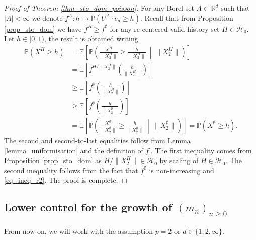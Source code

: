 \documentclass[a4paper, 11pt]{article}
\theoremstyle{plain}
\theoremstyle{definition}
\newcommand{\E}{\mathbb{E}}
\newcommand{\R}{\mathbb{R}}
\renewcommand{\P}{\mathbb{P}}
\numberwithin{equation}{section}
\begin{document}
\begin{proof}[Proof of Theorem \ref{thm_sto_dom_poisson}]
    For any Borel set $A\subset\R^d$ such that $|A|<\infty$ we denote $f^A:h\mapsto\P(U^A\cdot e_d\geq h)$. Recall that from Proposition \ref{prop_sto_dom} we have $f^H\geq f^\emptyset$ for any re-centered valid history set $H\in\mathcal H_0$. Let $h\in[0,1)$, the result is obtained writing
    \begin{equation*}
        \begin{split}
            \P(X^H\geq h)&=\E\left[\P\left(\frac{X^H}{\|X_2^H\|}\geq \frac{h}{\|X_2^H\|}~\middle\vert~ \|X_2^H\|\right)\right]\\
            &=\E\left[f^{H/\|X_2^H\|}\left(\frac{h}{\|X_2^H\|}\right)\right]\\
            &\geq\E\left[f^{\emptyset}\left(\frac{h}{\|X_2^H\|}\right)\right]\\
            &\geq\E\left[f^{\emptyset}\left(\frac{h}{\|X_2^\emptyset\|}\right)\right]\\
            &=\E\left[\P\left(\frac{X^\emptyset}{\|X_2^\emptyset\|}\geq\frac{h}{\|X_2^\emptyset\|}~\middle\vert~\|X_2^\emptyset\|\right)\right]=\P(X^\emptyset\geq h).
        \end{split}
    \end{equation*}
    The second and second-to-last equalities follow from Lemma \ref{lemma_uniformisation} and the definition of $f^\cdot$. The first inequality comes from Proposition \ref{prop_sto_dom} as $H/\|X_2^H\|\in\mathcal H_0$ by scaling of $H\in\mathcal H_0$. The second inequality follows from the fact that $f^\emptyset$ is non-increasing and \eqref{eq_ineq_r2}. The proof is complete.
\end{proof}


\subsection{Lower control for the growth of $(m_n)_{n\geq 0}$}

\label{subsection_lower_control}

From now on, we will work with the assumption $p=2$ or $d\in\{1, 2,\infty\}$.\\
\end{document}
